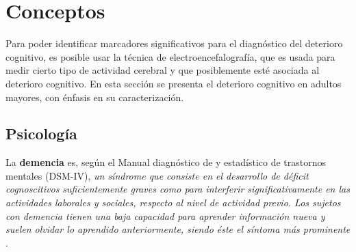 
\chapter{Conceptos}

Para poder identificar marcadores significativos para el diagnóstico del deterioro cognitivo, 
es posible usar la técnica de 
electroencefalografía, que es usada para medir cierto tipo de actividad cerebral y que 
posiblemente esté asociada al deterioro cognitivo. 
%
En esta sección se presenta el deterioro cognitivo en adultos mayores, con énfasis en su 
caracterización.
%

\section{Psicología}

La \textbf{demencia} es, según el Manual diagnóstico de y estadístico de trastornos mentales 
(DSM-IV), \textit{un síndrome que consiste en el desarrollo de déficit cognoscitivos 
suficientemente graves como para interferir significativamente en las actividades laborales y 
sociales, respecto al nivel de actividad previo. 
Los sujetos con demencia tienen una baja capacidad para aprender información nueva y suelen olvidar 
lo aprendido anteriormente, siendo éste el síntoma más prominente} \cite{DCM5}.

